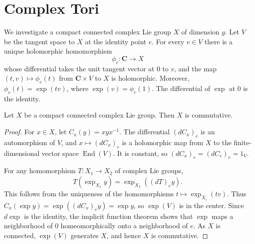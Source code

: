 
\section{Complex Tori}
\label{mumford-frag-I1}

We investigate a compact connected complex Lie group $X$ of dimension $g$.
Let $V$ be the tangent space to $X$ at the identity point $e$.  For every
$v\in V$ there is a unique holomorphic homomorphism
\[
 \phi_v:\mathbf C\longrightarrow X
\]
whose differential takes the unit tangent vector at $0$ to $v$, and
the map $(t,v)\mapsto\phi_v(t)$ from $\mathbf C\times V$ to $X$ is
holomorphic.  Moreover, $\phi_v(t)=\exp(tv)$, where
$\exp(v)=\phi_v(1)$.  The differential of
$\exp$ at $0$ is the identity.

\begin{theorem}
\label{mumford-frag-commutative}
Let $X$ be a compact connected complex Lie group.  Then $X$ is commutative.
\leanok
\end{theorem}
\begin{proof}
For $x\in X$, let $C_x(y)=xyx^{-1}$.  The differential $(dC_x)_e$ is an
automorphism of $V$, and $x\mapsto(dC_x)_e$ is a holomorphic map from $X$ to
the finite-dimensional vector space $\operatorname{End}(V)$.  It is constant,
so $(dC_x)_e=(dC_e)_e=1_V$.

For any homomorphism $T:X_1\to X_2$ of complex Lie groups,
\[
 T(\exp_{X_1}y)=\exp_{X_2}((dT)_e y).
\]
This follows from the uniqueness of the homomorphisms
$t\mapsto\exp_{X_i}(tv)$.  Thus
$C_x(\exp y)=\exp((dC_x)_e y)=\exp y$, so $\exp(V)$ is in the center.
Since $d\exp$ is the identity, the implicit function theorem shows that
$\exp$ maps a neighborhood of $0$ homeomorphically onto a neighborhood of
$e$.  As $X$ is connected, $\exp(V)$ generates $X$, and hence $X$ is
commutative.
\end{proof}

